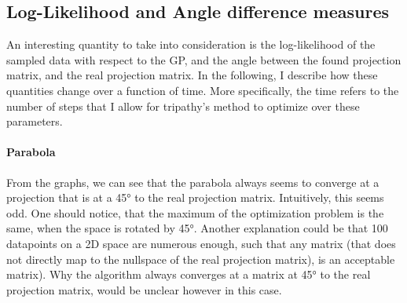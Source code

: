 \subsection{Log-Likelihood and Angle difference measures}

An interesting quantity to take into consideration is the log-likelihood of the sampled data with respect to the GP, and the angle between the found projection matrix, and the real projection matrix.
In the following, I describe how these quantities change over a function of time.
More specifically, the time refers to the number of steps that I allow for tripathy's method to optimize over these parameters.

\paragraph{Parabola}

From the graphs, we can see that the parabola always seems to converge at a projection that is at a 45° to the real projection matrix. 
Intuitively, this seems odd.
One should notice, that the maximum of the optimization problem is the same, when the space is rotated by 45°.
Another explanation could be that 100 datapoints on a 2D space are numerous enough, such that any matrix (that does not directly map to the nullspace of the real projection matrix), is an acceptable matrix).
Why the algorithm always converges at a matrix at 45° to the real projection matrix, would be unclear however in this case.

